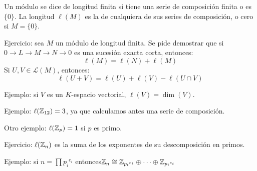 \begin{df}
  Un módulo se dice de longitud finita si tiene una serie de composición
  finita o es \(\{0\}\). La longitud \(\ell(M)\) es la de cualquiera
  de sus series de composición, o cero si \(M=\{0\}\).
\end{df}

Ejercicio: sea \(M\) un módulo de longitud finita. Se pide demostrar
que si \(0\longrightarrow L\longrightarrow M\longrightarrow N\longrightarrow
0\) es una sucesión exacta corta, entonces:
\[
  \ell(M)=\ell(N)+\ell(M)
\]
Si \(U,V\in\mathcal{L}(M)\), entonces:
\[
  \ell(U+V)=\ell(U)+\ell(V)-\ell(U\cap V)
\]

Ejemplo: si \(V\) es un \(K\)-espacio vectorial, \(\ell(V)=\dim(V)\).

Ejemplo: \(\ell(\mathbb{Z}_{12})=3\), ya que calculamos antes una serie de
composición.

Otro ejemplo: \(\ell(\mathbb{Z}_p)=1\) si \(p\) es primo.

Ejercicio: \(\ell(\mathbb{Z}_n)\) es la suma de los exponentes de su descomposición
en primos.

Ejemplo: si \(n=\prod {p_i}^{e_i}\) entonces\(\mathbb{Z}_n\cong
\mathbb{Z}_{{p_t}^{e_t}}\oplus\cdots
\oplus\mathbb{Z}_{{p_t}^{e_t}}\)
